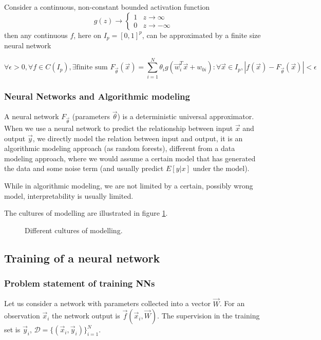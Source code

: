Consider a continuous, non-constant bounded activation function
\begin{equation}
    g(z) \rightarrow \begin{cases}
        1 & z \rightarrow \infty \\
        0 & z \rightarrow -\infty
    \end{cases}
\end{equation}
then any continuous $f$, here on $I_p = [0,1]^p$, can be approximated by a finite size
neural network

\begin{equation}
    \forall \epsilon > 0, \forall f \in C(I_p), \exists \text{finite sum } F_\vec{\theta}(\vec{x}) = \sum_{i=1}^{N} \theta_i g(\vec{w}_i^T \vec{x} + w_{0i}): \forall \vec{x} \in I_p, |f(\vec{x}) - F_\vec{\theta}(\vec{x})| < \epsilon
\end{equation}

\subsubsection{Neural Networks and Algorithmic modeling}
A neural network $F_\vec{\theta}$ (parameters $\vec{\theta}$) is a deterministic universal
approximator. When we use a neural network to predict the relationship between input $\vec{x}$
and output $\vec{y}$, we directly model the relation between input and output, it is an algorithmic
modeling approach (as random forests), different from a data modeling approach, where we would assume a certain
model that has generated the data and some noise term \citep{breiman01} (and usually predict $E[y|x]$ under the model).

While in algorithmic modeling, we are not limited by a certain, possibly wrong model, interpretability
is usually limited.

The cultures of modelling are illustrated in figure \ref{fig:modelling_cultures}.

\begin{figure}[!htb]
    \centering
    
    \caption{Different cultures of modelling.}
    \label{fig:modelling_cultures}
\end{figure}

\subsection{Training of a neural network}

\subsubsection{Problem statement of training NNs}
Let us consider a network with parameters collected into a vector $\vec{W}$.
For an observation $\vec{x}_i$ the network output is $\vec{f}(\vec{x}_i, \vec{W})$.
The supervision in the training set is $\vec{y}_i$, $\mathcal{D} = \{ (\vec{x}_i, \vec{y}_i) \}_{i=1}^{N}$.

